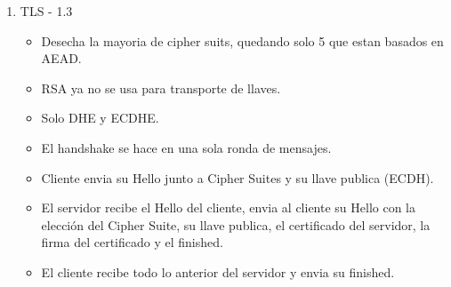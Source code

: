 \documentclass[11pt]{article}
\begin{document}
\begin{enumerate}
\begin{enumerate}
\item TLS segmenta las transmisiones en paquetes, cada paquetes esta cifrado y autenticado, ademas, estan estructurados en un formato llamado TLSCipherText.
\item Son de 16 kilobytes y son similares al struct de C.
\end{enumerate}
\begin{enumerate}
\item Derivación de llaves
\label{sec:org61dc098}
\begin{itemize}
\item El PMS se expande al master secret usando una función pseudo-aleatoria (PRF), que toma un secreto y lo expande a mas bytes, usando un mecanismo HMAC-SHA256 para expandir bytes de entrada a un tamaño arbitrario.
\item El PMS se expande hasta 48 bytes para generar el master secret.
\item El master secret tambien se expande (usando PRF) a tantos bytes sea necesario para obtener las llaves de sesión e IV's requeridos.
\item Del master secret se obtiene el key\textsubscript{block} que varia del tamaño dependiendo del cipher suite.
\item El key\textsubscript{block} tiene maximo 6 parametros, esto depende del Cipher Suite:
\begin{itemize}
\item Cliente MAC key
\item Servidor MAC key
\item Cliente cifrado key
\item Servidor cifrado key
\item Cliente IV
\item Servidor IV
\end{itemize}
\end{itemize}
\end{enumerate}
\item TLS - 1.3
\label{sec:org3dcef18}
\begin{itemize}
\item Desecha la mayoria de cipher suits, quedando solo 5 que estan basados en AEAD.
\item RSA ya no se usa para transporte de llaves.
\item Solo DHE y ECDHE.
\item El handshake se hace en una sola ronda de mensajes.

\item Cliente envia su Hello junto a Cipher Suites y su llave publica (ECDH).
\item El servidor recibe el Hello del cliente, envia al cliente su Hello con la elección del Cipher Suite, su llave publica, el certificado del servidor, la firma del certificado y el finished.
\item El cliente recibe todo lo anterior del servidor y envia su finished.


\end{itemize}
\end{enumerate}
\end{document}
